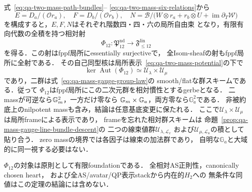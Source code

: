 \begin{theorem}
\label{thm:qa-two-mass-all-finite-foundation-gerbe}
式~\eqref{eq:qa-two-mass-path-bundles}--%
\eqref{eq:qa-two-mass-six-relations}から
\[
 E=D_a/(\mathcal O r_a),\quad
 F=D_b/(\mathcal O r_b),\quad
 N=\mathcal B/
 \bigl(W\otimes r_a+r_b\otimes U+
       \operatorname{im}\partial_T\mathcal W\bigr)
 \tag{REC}\label{eq:qa-two-mass-foundation-reconstruction}
\]
を構成すると，$E,F,N$はそれぞれ階数四・四・六の局所自由束
となり，有限有向代数の全積を持つ相対射
\[
 \Phi_{12}:\mathfrak P_{12}^{\mathrm{nd}}
                 \longrightarrow\mathfrak F_{\le12}^{\mathrm{lin}}
 \tag{GM}\label{eq:qa-two-mass-gerbe-map}
\]
を得る．この射はfppf局所にessentially surjectiveで，
全Isom-sheafの射もfppf局所に全射である．
その自己同型核は局所表示~\eqref{eq:qa-two-mass-potential}の下で
\[
 \boxed{\quad
 \ker\operatorname{Aut}(\Phi_{12})
       \simeq\mathcal U_\lambda\times\mathcal U_\mu
 \quad}
 \tag{G2}\label{eq:qa-two-mass-gauge-kernel}
\]
であり，二群は式~\eqref{eq:qa-mass-gauge-group-law}の
smooth/flatな群スキームである．従って
$\Phi_{12}$はfppf局所にこの二次元群を相対慣性とするgerbeとなる．
二massが可逆なら$\mathbb G_m^2$，一方だけ零なら
$\mathbb G_m\times\mathbb G_a$，両方零なら$\mathbb G_a^2$である．
非被約底上のnilpotent massも含み，結論は任意基底変更に保たれる．
ここで$\mathcal U_\lambda\times\mathcal U_\mu$は局所frameによる表示であり，
frameを忘れた相対群スキームは
命題~\ref{prop:qa-mass-gauge-line-bundle-descent}の
二つの線束値群$\mathcal U_{\lambda,\mathscr L_x}$
および$\mathcal U_{\mu,\mathscr L_u}$の積として貼り合う．
zero massの境界では各因子は線束の加法群であり，
自明な$\mathbb G_a$と大域的に同一視する必要はない．

$\Phi_{12}$の対象は原則として有限foundationである．
全相対AS正則性，canonically chosen heart，
および全AS/avatar/QP表示stackから内在的$H_2$への
無条件な同値はこの定理の結論には含めない．
\end{theorem}
